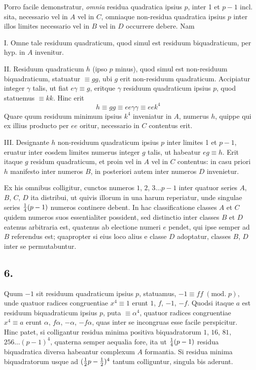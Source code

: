 \documentclass[twoside,12pt, showframe]{memoir}
\renewcommand{\pmod}[1]{\;(\textrm{mod.}\;#1)}
\let\oldfrac\frac
\def\frac#1#2{\mathchoice{\tfrac{#1}{#2}}{\oldfrac{#1}{#2}}{\genfrac{}{}{}{2}{#1}{#2\mathstrut}}{\genfrac{}{}{}{3}{#1}{#2\mathstrut}}}
\begin{document}
Porro facile demonstratur, \textit{omnia} residua quadratica ipsius \(p\), inter 1 et \(p-1\) incl. sita, necessario vel in \(A\) vel in \(C\), omniaque non-residua quadratica ipsius \(p\) inter illos limites necessario vel in \(B\) vel in \(D\) occurrere debere. Nam
 
I. Omne tale residuum quadraticum, quod simul est residuum biquadraticum, per hyp. in \(A\) invenitur.
 
II. Residuum quadraticum \(h\) (ipso \(p\) minus), quod simul est non-residuum biquadraticum, statuatur \(\equiv g g\), ubi \(g\) erit non-residuum quadraticum. Accipiatur integer \(\gamma\) talis, ut fiat \(e \gamma \equiv g\), eritque \(\gamma\) residuum quadraticum ipsius \(p\), quod statuemus \(\equiv k k\). Hinc erit
\[h \equiv g g \equiv e e \gamma \gamma \equiv e e k^{4}\]
Quare quum residuum minimum ipsius \(k^{4}\) inveniatur in \(A\), numerus \(h\), quippe qui ex illius producto per \(e e\) oritur, necessario in \(C\) contentus erit.
 
III. Designante \(h\) non-residuum quadraticum ipsius \(p\) inter limites 1 et \(p-1\), eruatur inter eosdem limites numerus integer \(g\) talis, ut habeatur \(e g \equiv h\). Erit itaque \(g\) residum quadraticum, et proin vel in \(A\) vel in \(C\) contentus: in casu priori \(h\) manifesto inter numeros \(B\), in posteriori autem inter numeros \(D\) invenietur.

Ex his omnibus colligitur, cunctos numeros \(1\), \(2\), \(3 \ldots p-1\) inter quatuor series \(A\), \(B\), \(C\), \(D\) ita distribui, ut quivis illorum in una harum reperiatur, unde singulae series \(\frac{1}{4}(p-1)\) numeros continere debent. In hac classificatione classes \(A\) et \(C\) quidem numeros suos essentialiter possident, sed distinctio inter classes \(B\) et \(D\) eatenus arbitraria est, quatenus ab electione numeri \(e\) pendet, qui ipse semper ad \(B\) referendus est; quapropter si eius loco alius e classe \(D\) adoptatur, classes \(B\), \(D\) inter se permutabuntur.

\subsection*{6.}
 
Quum \(-1\) sit residuum quadraticum ipsius \(p\), statuamus, \(-1 \equiv f f\pmod{p}\), unde quatuor radices congruentiae \(x^{4} \equiv 1\) erunt \(1\), \(f\), \(-1\), \(-f\). Quodsi itaque\clearpage\noindent%
\(a\) est residuum biquadraticum ipsius \(p\), puta \(\equiv \alpha^{4}\), quatuor radices congruentiae \(x^{4} \equiv a\) erunt \(\alpha\), \(f \alpha\), \(-\alpha\), \(-f \alpha\), quas inter se incongruas esse facile perspicitur. Hinc patet, si colligantur residua minima positiva biquadratorum \(1\), \(16\), \(81\), \(256 \ldots (p-1)^{4}\), quaterna semper aequalia fore, ita ut \(\frac{1}{4}(p-1)\) residua biquadratica diversa habeantur complexum \(A\) formantia. Si residua minima biquadratorum usque ad \((\frac{1}{2} p-\frac{1}{2})^{4}\) tantum colliguntur, singula bis aderunt.
\end{document}
